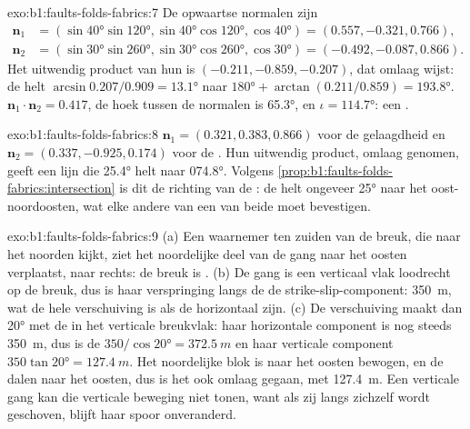 \begin{solution}{exo:b1:faults-folds-fabrics:7}
De opwaartse normalen zijn
\begin{align*}
  \mathbf n_1 &= (\sin\ang{40}\sin\ang{120}, \sin\ang{40}\cos\ang{120}, \cos\ang{40}) = (0.557, -0.321, 0.766),\\
  \mathbf n_2 &= (\sin\ang{30}\sin\ang{260}, \sin\ang{30}\cos\ang{260}, \cos\ang{30}) = (-0.492, -0.087, 0.866).
\end{align*}
Het uitwendig product van hun is
$(-0.211, -0.859, -0.207)$, dat omlaag wijst: de  helt
$\arcsin 0.207/0.909 = \ang{13.1}$ naar $\ang{180} + \arctan(0.211/0.859) =
\ang{193.8}$. $\mathbf n_1\cdot\mathbf n_2 = 0.417$, de hoek tussen de
normalen is \ang{65.3}, en $\iota = \ang{114.7}$: een .
\end{solution}

\begin{solution}{exo:b1:faults-folds-fabrics:8}
$\mathbf n_1 = (0.321, 0.383, 0.866)$ voor de gelaagdheid en
$\mathbf n_2 = (0.337, -0.925, 0.174)$ voor de . Hun uitwendig product,
omlaag genomen, geeft een lijn die \ang{25.4} helt naar \ang{074.8}. Volgens
\cref{prop:b1:faults-folds-fabrics:intersection} is dit de richting van de
: de  helt ongeveer \ang{25} naar het oost-noordoosten, wat
elke andere  van een van beide  moet bevestigen.
\end{solution}

\begin{solution}{exo:b1:faults-folds-fabrics:9}
(a) Een waarnemer ten zuiden van de breuk, die naar het noorden kijkt, ziet het noordelijke deel van de
gang naar het oosten verplaatst, naar rechts: de breuk is . (b) De gang is een
verticaal vlak loodrecht op de breuk, dus is haar verspringing langs de  de
strike-slip-component: \qty{350}{m}, wat de hele verschuiving is als de
 horizontaal zijn. (c) De verschuiving maakt dan \ang{20} met de 
in het verticale breukvlak: haar horizontale component is nog steeds \qty{350}{m},
dus is de  $350/\cos\ang{20} = \qty{372.5}{m}$ en haar verticale
component $350\tan\ang{20} = \qty{127.4}{m}$. Het noordelijke blok is naar het oosten bewogen,
en de  dalen naar het oosten, dus is het ook omlaag gegaan, met
\qty{127.4}{m}. Een verticale gang kan die verticale beweging niet tonen, want als zij langs zichzelf wordt geschoven, blijft haar spoor onveranderd.
\end{solution}

